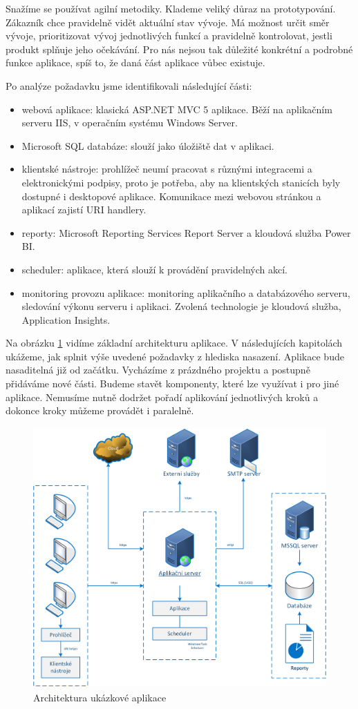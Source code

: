 Snažíme se používat agilní metodiky. Klademe veliký důraz na prototypování. Zákazník chce pravidelně vidět aktuální stav vývoje. Má možnost určit směr vývoje, prioritizovat vývoj jednotlivých funkcí a pravidelně kontrolovat, jestli produkt splňuje jeho očekávání. Pro nás nejsou tak důležité konkrétní a podrobné funkce aplikace, spíš to, že daná část aplikace vůbec existuje. 

Po analýze požadavku jsme identifikovali následující části:
\begin{itemize}
\item webová aplikace: klasická ASP.NET MVC 5 aplikace. Běží na aplikačním serveru IIS, v operačním systému Windows Server.
\item Microsoft SQL databáze: slouží jako úložiště dat v aplikaci.
\item klientské nástroje: prohlížeč neumí pracovat s různými integracemi a elektronickými podpisy, proto je potřeba, aby na klientských stanicích byly dostupné i desktopové aplikace. Komunikace mezi webovou stránkou a aplikací zajistí URI handlery.
\item reporty: Microsoft Reporting Services Report Server a kloudová služba Power BI.
\item scheduler: aplikace, která slouží k provádění pravidelných akcí.
\item monitoring provozu aplikace: monitoring aplikačního a databázového serveru, sledování výkonu serveru i aplikaci. Zvolená technologie je kloudová služba, Application Insights.
\end{itemize}

Na obrázku \ref{fig:architektura} vidíme základní architekturu aplikace. V následujících kapitolách ukážeme, jak splnit výše uvedené požadavky z hlediska nasazení. Aplikace bude nasaditelná již od začátku. Vycházíme z prázdného projektu a postupně přidáváme nové části. Budeme stavět komponenty, které lze využívat i pro jiné aplikace. Nemusíme nutně dodržet pořadí aplikování jednotlivých kroků a dokonce kroky můžeme provádět i paralelně.
 
\begin{figure}[]
  \centering
  \includegraphics[height=10cm]{fig/app_architektura.png}
  \caption{Architektura ukázkové aplikace}
  \label{fig:architektura}
\end{figure}


